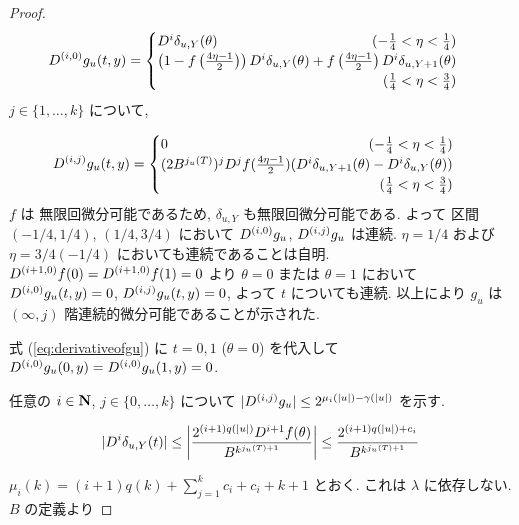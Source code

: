 \begin{proof}
  \begin{equation}
   \label{eq:derivativeofgu}
    \D^{(i,0)} g_u(t, y)
     = \begin{cases}
 	\D^i \delta_{u, Y}(\theta) 
	\hfill (- \frac 1 4 < \eta < \frac 1 4) \\
	\left( 1-f \left(\frac{4\eta-1}{2}\right)\right) 
	\D^i \delta_{u, Y}(\theta) 
	+ f \left(\frac{4\eta-1}{2}\right) \D^i \delta_{u,Y+1}(\theta) \\
	\hfill (\frac 1 4 < \eta < \frac 3 4)
       \end{cases}
  \end{equation}   
  $j \in \{1, \dots , k\}$ について,

  \begin{equation}
    \D^{(i,j)} g_u(t, y)
     = \begin{cases}
	0 \hfill (- \frac 1 4 < \eta < \frac 1 4) \\
	(2B^{j_u(T)})^j \D^j f(\frac{4\eta - 1}2)
	(\D^i \delta_{u,Y+1}(\theta)-\D^i \delta_{u, Y}(\theta)) \\
	\hfill (\frac 1 4 < \eta < \frac 3 4)
       \end{cases}
  \end{equation}
  $f$ は 無限回微分可能であるため, $\delta_{u,Y}$ も無限回微分可能である.
  よって 区間 $(-1/4, 1/4)$, $(1/4, 3/4)$ において
  $D^{(i, 0)} g_u$, $D^{(i,j)} g_u$ は連続. 
  $\eta = 1/4$ および  $\eta = 3/4(-1/4)$ においても連続であることは自明.
  $D^{(i+1, 0)} f(0) = D^{(i+1, 0)} f(1) = 0$ より $\theta = 0$ または $\theta = 1$
  において $D^{(i, 0)}g_u(t, y) = 0$, $D^{(i, j)}g_u(t, y) = 0$,
  よって $t$ についても連続.
  以上により $g_u$ は $(\infty, j)$ 階連続的微分可能であることが示された.

  式 (\ref{eq:derivativeofgu}) に $t = 0, 1$ ($\theta = 0$) を代入して
  $D^{(i, 0)} g_u(0,y) = D^{(i, 0)} g_u(1,y) = 0$.

  任意の $i \in \mathbf N$, $j \in \{0, \dots, k\}$ について
  $|D^{(i,j)} g_u| \leq 2^{\mu_i (|u|) - \gamma(|u|)}$ を示す.

  \begin{equation}
   |D^i \delta_{u, Y}(t)| 
    \le \left|\frac{2^{(i+1)q(|u|)}D^{i+1}f(\theta)}{B^{k^{j_u(T)+1}}} \right|
    \le \frac{2^{(i+1)q(|u|) + c_i}}{B^{k^{j_u(T)+1}}}\\
  \end{equation}

  $\mu_i(k) = (i+1)q(k) + \sum^k_{j=1}c_i + c_i + k + 1$ とおく.
  これは $\lambda$ に依存しない.
  $B$ の定義より


\end{proof}
